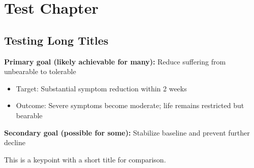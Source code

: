 \documentclass{book}
\begin{document}
\chapter{Test Chapter}

\section{Testing Long Titles}

\begin{keypoint}

\textbf{Primary goal (likely achievable for many):} Reduce suffering from unbearable to tolerable
\begin{itemize}
    \item Target: Substantial symptom reduction within 2 weeks
    \item Outcome: Severe symptoms become moderate; life remains restricted but bearable
\end{itemize}

\textbf{Secondary goal (possible for some):} Stabilize baseline and prevent further decline

\end{keypoint}

\begin{keypoint}
This is a keypoint with a short title for comparison.
\end{keypoint}
\end{document}
